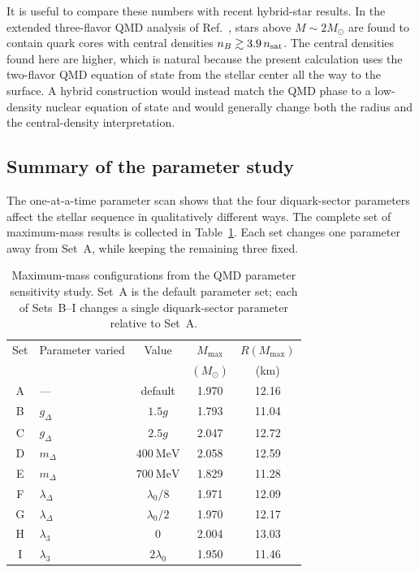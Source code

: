 It is useful to compare these numbers with recent hybrid-star results.
In the extended three-flavor QMD analysis of Ref.~\cite{Andersen2026},
stars above \(M\sim2M_\odot\) are found to contain quark cores with
central densities \(n_B\gtrsim3.9\,n_{\rm sat}\). The central densities
found here are higher, which is natural because the present calculation
uses the two-flavor QMD equation of state from the stellar center all
the way to the surface. A hybrid construction would instead match the
QMD phase to a low-density nuclear equation of state and would generally
change both the radius and the central-density interpretation.

\subsection*{Summary of the parameter study}
\label{subsec:qmd_param_summary}

The one-at-a-time parameter scan shows that the four diquark-sector
parameters affect the stellar sequence in qualitatively different ways.
The complete set of maximum-mass results is collected in
Table~\ref{tab:qmd_param_summary}. Each set changes one parameter away
from Set~A, while keeping the remaining three fixed.

\begin{table}[H]
\centering
\small
\begin{tabular}{c l c c c}
\hline
Set & Parameter varied & Value & \(M_{\max}\) & \(R(M_{\max})\) \\
& & & \((M_\odot)\) & (km) \\
\hline
A & --- & default & 1.970 & 12.16 \\
\hline
B & \(g_\Delta\) & \(1.5g\) & 1.793 & 11.04 \\
C & \(g_\Delta\) & \(2.5g\) & 2.047 & 12.72 \\
\hline
D & \(m_\Delta\) & \(400~\mathrm{MeV}\) & 2.058 & 12.59 \\
E & \(m_\Delta\) & \(700~\mathrm{MeV}\) & 1.829 & 11.28 \\
\hline
F & \(\lambda_\Delta\) & \(\lambda_0/8\) & 1.971 & 12.09 \\
G & \(\lambda_\Delta\) & \(\lambda_0/2\) & 1.970 & 12.17 \\
\hline
H & \(\lambda_3\) & \(0\) & 2.004 & 13.03 \\
I & \(\lambda_3\) & \(2\lambda_0\) & 1.950 & 11.46 \\
\hline
\end{tabular}
\caption{Maximum-mass configurations from the QMD parameter sensitivity
study. Set~A is the default parameter set; each of Sets~B--I changes a
single diquark-sector parameter relative to Set~A.}
\label{tab:qmd_param_summary}
\end{table}

